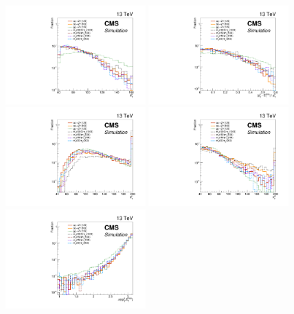 \begin{figure}[htbp]
  \centering
  \includegraphics[width=0.48\textwidth]{figures/signals_ptll_presel.pdf}
  \includegraphics[width=0.48\textwidth]{figures/signals_balance_presel.pdf}
  \includegraphics[width=0.48\textwidth]{figures/signals_ptl1_fullsel.pdf}
  \includegraphics[width=0.48\textwidth]{figures/signals_ptl2_fullsel.pdf}
  \includegraphics[width=0.48\textwidth]{figures/signals_dphiZMET_nminusone.pdf}

\end{figure}
